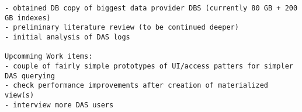 \documentclass[a4paper,11pt,draft]{article}
\begin{document}
\begin{verbatim}
- obtained DB copy of biggest data provider DBS (currently 80 GB + 200 GB indexes)
- preliminary literature review (to be continued deeper)
- initial analysis of DAS logs

Upcomming Work items:
- couple of fairly simple prototypes of UI/access patters for simpler DAS querying
- check performance improvements after creation of materialized view(s)
- interview more DAS users
\end{verbatim}



\thispagestyle{empty}
\begin{small}

\end{small}

\pagebreak

\end{document}
